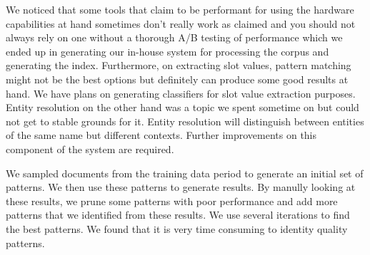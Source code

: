 We noticed that some tools that claim to be performant for using the hardware capabilities at hand sometimes don't really work as claimed and you should not always rely on one without a thorough A/B testing of performance which we ended up in generating our in-house system for processing the corpus and generating the index. Furthermore, on extracting slot values, pattern matching might not be the best options but definitely can produce some good results at hand. We have plans on generating classifiers for slot value extraction purposes. Entity resolution on the other hand was a topic we spent sometime on but could not get to stable grounds for it. Entity resolution will distinguish between entities of the same name but different contexts. Further improvements on this component of the system are required. 


We sampled documents from the training data period to generate an initial set of patterns. We then use these patterns to generate  results. By manully looking at these results, we prune some patterns with poor ­performance and add more patterns that we identified from these results. We use several iterations to find the best patterns. We found that it is very time consuming to identity quality patterns.
